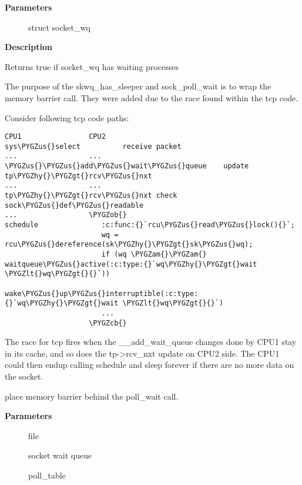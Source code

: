 \documentclass[a4paper,8pt,english]{sphinxmanual}
\def\PYGZus{\char`\_}
\def\PYGZob{\char`\{}
\def\PYGZcb{\char`\}}
\def\PYGZam{\char`\&}
\def\PYGZlt{\char`\<}
\def\PYGZgt{\char`\>}
\def\PYGZhy{\char`\-}
\begin{document}
\textbf{Parameters}
\begin{description}
\item[{}] \leavevmode
struct socket\_wq

\end{description}

\textbf{Description}

Returns true if socket\_wq has waiting processes

The purpose of the skwq\_has\_sleeper and sock\_poll\_wait is to wrap the memory
barrier call. They were added due to the race found within the tcp code.

Consider following tcp code paths:

\begin{Verbatim}[commandchars=\\\{\}]
CPU1                CPU2
sys\PYGZus{}select          receive packet
...                 ...
\PYGZus{}\PYGZus{}add\PYGZus{}wait\PYGZus{}queue    update tp\PYGZhy{}\PYGZgt{}rcv\PYGZus{}nxt
...                 ...
tp\PYGZhy{}\PYGZgt{}rcv\PYGZus{}nxt check   sock\PYGZus{}def\PYGZus{}readable
...                 \PYGZob{}
schedule               :c:func:{}`rcu\PYGZus{}read\PYGZus{}lock(){}`;
                       wq = rcu\PYGZus{}dereference(sk\PYGZhy{}\PYGZgt{}sk\PYGZus{}wq);
                       if (wq \PYGZam{}\PYGZam{} waitqueue\PYGZus{}active(:c:type:{}`wq\PYGZhy{}\PYGZgt{}wait \PYGZlt{}wq\PYGZgt{}{}`))
                           wake\PYGZus{}up\PYGZus{}interruptible(:c:type:{}`wq\PYGZhy{}\PYGZgt{}wait \PYGZlt{}wq\PYGZgt{}{}`)
                       ...
                    \PYGZcb{}
\end{Verbatim}

The race for tcp fires when the \_\_add\_wait\_queue changes done by CPU1 stay
in its cache, and so does the tp-\textgreater{}rcv\_nxt update on CPU2 side.  The CPU1
could then endup calling schedule and sleep forever if there are no more
data on the socket.

\begin{fulllineitems}
\label{networking/kapi:c.sock_poll_wait}
place memory barrier behind the poll\_wait call.

\end{fulllineitems}


\textbf{Parameters}
\begin{description}
\item[{}] \leavevmode
file

\item[{}] \leavevmode
socket wait queue

\item[{}] \leavevmode
poll\_table

\end{description}
\end{document}
